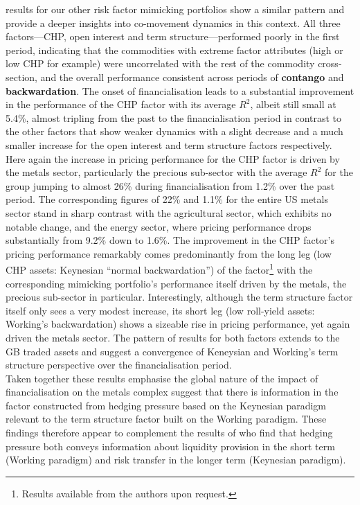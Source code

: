 \documentclass[
  authoryear,
  preprint,
  3p]{elsarticle}
\begin{document}
results for our other risk factor mimicking portfolios show a similar
pattern and provide a deeper insights into co-movement dynamics in this
context. All three factors---CHP, open interest and term
structure---performed poorly in the first period, indicating that the
commodities with extreme factor attributes (high or low CHP for example)
were uncorrelated with the rest of the commodity cross-section, and the
overall performance consistent across periods of \textbf{contango} and
\textbf{backwardation}. The onset of financialisation leads to a
substantial improvement in the performance of the CHP factor with its
average \(R^{2}\), albeit still small at 5.4\%, almost tripling from the
past to the financialisation period in contrast to the other factors
that show weaker dynamics with a slight decrease and a much smaller
increase for the open interest and term structure factors respectively.
Here again the increase in pricing performance for the CHP factor is
driven by the metals sector, particularly the precious sub-sector with
the average \(R^{2}\) for the group jumping to almost 26\% during
financialisation from 1.2\% over the past period. The corresponding
figures of 22\% and 1.1\% for the entire US metals sector stand in sharp
contrast with the agricultural sector, which exhibits no notable change,
and the energy sector, where pricing performance drops substantially
from 9.2\% down to 1.6\%. The improvement in the CHP factor's pricing
performance remarkably comes predominantly from the long leg (low CHP
assets: Keynesian ``normal backwardation'') of the factor\footnote{Results
  available from the authors upon request.} with the corresponding
mimicking portfolio's performance itself driven by the metals, the
precious sub-sector in particular. Interestingly, although the term
structure factor itself only sees a very modest increase, its short leg
(low roll-yield assets: Working's backwardation) shows a sizeable rise
in pricing performance, yet again driven the metals sector. The pattern
of results for both factors extends to the GB traded assets and suggest
a convergence of Keneysian and Working's term structure perspective over
the financialisation period.\\
Taken together these results emphasise the global nature of the impact
of financialisation on the metals complex suggest that there is
information in the factor constructed from hedging pressure based on the
Keynesian paradigm relevant to the term structure factor built on the
Working paradigm. These findings therefore appear to complement the
results of \citet{kang_tale_2020} who find that hedging pressure both
conveys information about liquidity provision in the short term (Working
paradigm) and risk transfer in the longer term (Keynesian paradigm).
\end{document}
